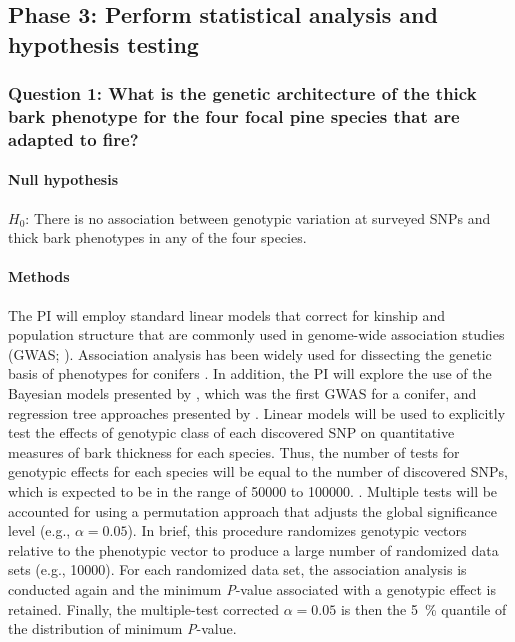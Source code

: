 \subsection*{Phase 3: Perform statistical analysis and hypothesis testing}

\subsubsection*{Question 1: What is the genetic architecture of the thick bark phenotype for the four focal pine species that 
are adapted to fire?}

\paragraph{Null hypothesis} $H_0$: There is no association between genotypic variation at surveyed SNPs and thick bark 
phenotypes in any of the four species.

\paragraph{Methods} The PI will employ standard linear models that correct for kinship and population structure that are 
commonly used in genome-wide association studies (GWAS; \citet{Yu:2006ij}). Association analysis has been widely 
used for dissecting the genetic basis of phenotypes for conifers \citep{Neale:2011jh, Ingvarsson:2011fg}. 
In addition, the PI will explore the use of the Bayesian models presented by \citet{Parchman:2012ca}, which 
was the first GWAS for a conifer, and regression tree approaches presented by \citet{Holliday:2012fz}. 
Linear models will be used to explicitly test the effects of genotypic class of each discovered SNP on quantitative 
measures of bark thickness for each species. Thus, the number of tests for genotypic effects for each species will 
be equal to the number of discovered SNPs, which is expected to be in the range of \num{50000} to \num{100000}. 
\citep{Parchman:2012ca}. Multiple tests will be accounted for using a permutation approach that adjusts the 
global significance level (e.g., $\alpha= 0.05$). In brief, this procedure randomizes genotypic vectors relative to the 
phenotypic vector to produce a large number of randomized data sets (e.g., \num{10000}). For each randomized data 
set, the association analysis is conducted again and the minimum \emph{P}-value associated with a genotypic effect is 
retained. Finally, the multiple-test corrected $\alpha = 0.05$ is then the \SI{5}{\percent} quantile of the distribution of 
minimum \emph{P}-value. 

